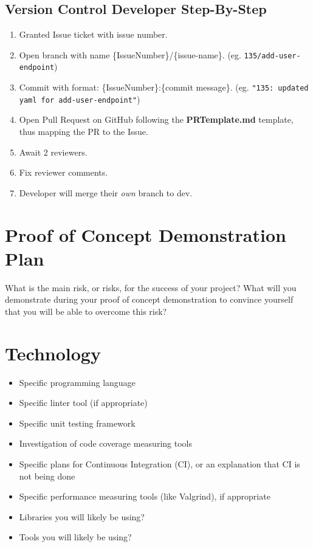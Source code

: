 \documentclass{article}
\def\code#1{\texttt{#1}}
\begin{document}
\subsection{Version Control Developer Step-By-Step}

\begin{enumerate}
	\item Granted Issue ticket with issue number.
	\item Open branch with name \{IssueNumber\}/\{issue-name\}. (eg. \code{135/add-user-endpoint})
	\item Commit with format: \{IssueNumber\}:\{commit message\}. (eg. \code{"135: updated yaml for add-user-endpoint"})
	\item Open Pull Request on GitHub following the \textbf{PRTemplate.md} template, thus mapping the PR to the Issue.
	\item Await 2 reviewers.
	\item Fix reviewer comments.
	\item Developer will merge their \emph{own} branch to dev.
\end{enumerate}

\section{Proof of Concept Demonstration Plan}

What is the main risk, or risks, for the success of your project?  What will you
demonstrate during your proof of concept demonstration to convince yourself that
you will be able to overcome this risk?

\section{Technology}

\begin{itemize}
\item Specific programming language
\item Specific linter tool (if appropriate)
\item Specific unit testing framework
\item Investigation of code coverage measuring tools
\item Specific plans for Continuous Integration (CI), or an explanation that CI
  is not being done
\item Specific performance measuring tools (like Valgrind), if
  appropriate
\item Libraries you will likely be using?
\item Tools you will likely be using?
\end{itemize}
\end{document}
